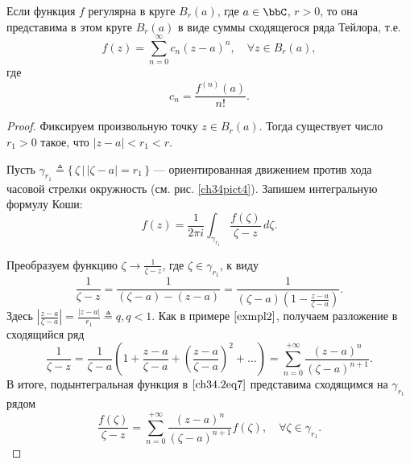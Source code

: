 \begin{thm} \label{abc29}
Если функция $f$ регулярна в круге $B_r(a)$, где $a \in \bbC$, $r > 0$, то она представима в этом круге $B_r(a)$ в виде суммы сходящегося ряда Тейлора, т.е.
\begin{equation} \label{ch34.2eq5}
f(z) = \sum\limits_{n = 0}^{\infty} c_n(z - a)^n, \quad \forall z \in B_r(a),
\end{equation}
где
\begin{equation} \label{ch34.2eq6}
c_n = \frac{f^{(n)}(a)}{n!}.
\end{equation}

\end{thm}
\begin{proof}
Фиксируем произвольную точку $z \in B_r(a)$. Тогда существует число $r_1 > 0$ такое, что $|z - a| < r_1 < r$.

Пусть $\gamma_{r_1} \triangleq \{\,\zeta \,\big|\, |\zeta - a| = r_1 \,\}$ — ориентированная движением против хода часовой стрелки окружность (см. рис. \ref{ch34pict4}). Запишем интегральную формулу Коши:
\begin{equation} \label{ch34.2eq7}
f(z) = \frac{1}{2 \pi i} \int_{\gamma_{r_1}} \frac{f(\zeta)}{\zeta - z} \,d\zeta.
\end{equation}

Преобразуем функцию $\zeta \to \frac{1}{\zeta - z}$, где $\zeta \in \gamma_{r_1}$, к виду
$$
\frac{1}{\zeta - z} = \frac{1}{(\zeta - a) - (z - a)} = \frac{1}{(\zeta - a)\left( 1 - \frac{z - a}{\zeta - a}\right)}.
$$
Здесь $\left|\frac{z - a}{\zeta - a} \right| = \frac{|z - a|}{r_1} \triangleq q, q < 1$. Как в примере $\ref{exmpl2}$, получаем разложение в сходящийся ряд
$$
\frac{1}{\zeta - z} = \frac{1}{\zeta - a} \left( 1 + \frac{z - a}{\zeta - a} + \left( \frac{z - a}{\zeta - a}\right)^2 + \ldots \right) = \sum\limits_{n = 0}^{+\infty} \frac{(z - a)^n}{(\zeta - a)^{n + 1}}.
$$
В итоге, подынтегральная функция в $\eqref{ch34.2eq7}$ представима сходящимся на $\gamma_{r_1}$ рядом
\begin{equation} \label{ch34.2eq8}
\frac{f(\zeta)}{\zeta - z} = \sum\limits_{n = 0}^{+\infty} \frac{(z - a)^n}{(\zeta - a)^{n + 1}} f(\zeta), \quad \forall \zeta \in \gamma_{r_1}.
\end{equation}


\end{proof}
